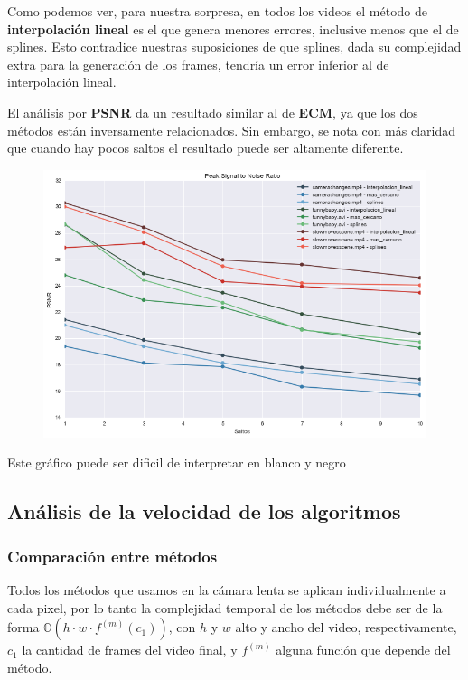 Como podemos ver, para nuestra sorpresa, en todos los videos el m\'etodo de \textbf{interpolaci\'on
lineal} es el que genera menores errores, inclusive menos que el de splines. Esto contradice nuestras
suposiciones de que splines, dada su complejidad extra para la generaci\'on de los frames, tendr\'ia 
un error inferior al de interpolaci\'on lineal.

El an\'alisis por \textbf{PSNR} da un resultado similar al de \textbf{ECM}, ya
que los dos m\'etodos est\'an inversamente relacionados. Sin embargo, se nota
con m\'as claridad que cuando hay pocos saltos el resultado puede ser altamente
diferente.

\begin{figure}[H]
\centering
\includegraphics[width=.95\textwidth]{graficos/psnr.png}
\end{figure}
\vspace{-2em}
\begin{tiny}Este gr\'afico puede ser dificil de interpretar en blanco y negro\end{tiny}
\vspace{2em}

\subsection{An\'alisis de la velocidad de los algoritmos}

\subsubsection{Comparaci\'on entre m\'etodos}

Todos los m\'etodos que usamos en la c\'amara lenta se aplican individualmente a
cada pixel, por lo tanto la complejidad temporal de los m\'etodos debe ser de la
forma $ \mathbb{O}(h \cdot w \cdot f^{(m)}(c_1)) $, con $h$ y $w$ alto y ancho del
video, respectivamente, $c_1$ la cantidad de frames del video final, y $f^{(m)}$
alguna funci\'on que depende del m\'etodo.

